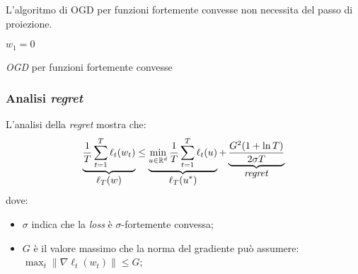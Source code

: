 L'algoritmo di OGD per funzioni fortemente convesse non necessita del passo di
proiezione.

\begin{algorithm}[H]
    \DontPrintSemicolon
    $w_1 = 0\qquad$ \;
    \caption{\textit{OGD} per funzioni fortemente convesse}
\end{algorithm}

\subsubsection{Analisi \textit{regret}}
L'analisi della \textit{regret} mostra che:
$$
\underbrace{\frac{1}{T}\sum_{t=1}^{T}\ell_t(w_t)}_{\displaystyle\ell_T(w)}\leq
\underbrace{\min_{u\in\mathbb{R}^d} \frac{1}{T}\sum_{t=1}^T \ell_t(u)}_
    {\displaystyle\ell_T(u^*)}
+\underbrace{\frac{G^2(1+\ln{T})}{2\sigma T}}_{\displaystyle\text{\textit{regret}}}
$$
dove:
\begin{itemize}
    \item $\sigma$ indica che la \textit{loss} è $\sigma$-fortemente convessa;
    \item $G$ è il valore massimo che la norma del gradiente può assumere: 
        $\max_t{\|\nabla\ell_t(w_t)\|\leq G}$;
\end{itemize}